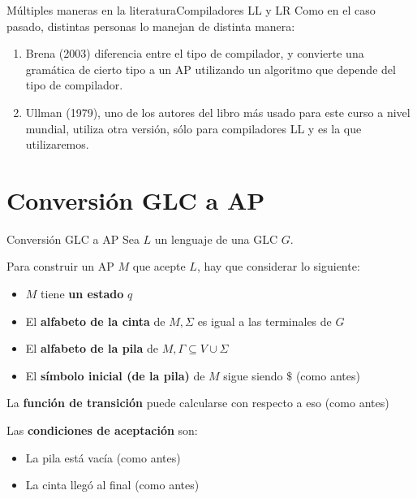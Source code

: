 \documentclass[spanish]{beamer}
\begin{document}
\begin{frame}{Múltiples maneras en la literatura}{Compiladores LL y LR}
    Como en el caso pasado, distintas personas lo manejan de distinta manera:

    \begin{enumerate}
        \itemsep2.5ex
        \item Brena (2003) diferencia entre el tipo de compilador, y convierte una gramática de cierto tipo a un AP utilizando un algoritmo que depende del tipo de compilador. \pause
        \item Ullman (1979), uno de los autores del libro más usado para este curso a nivel mundial, utiliza otra versión, sólo para compiladores LL y es la que utilizaremos.
    \end{enumerate}
\end{frame}

\section{Conversión GLC a AP}

\begin{frame}{Conversión GLC a AP}
    Sea $L$ un lenguaje de una GLC $G$. \pause

    \bigskip

    Para construir un AP $M$ que acepte $L$, hay que considerar lo siguiente: \pause

    \begin{itemize}
        \item $M$ tiene \textbf{un estado} $q$ \pause
        \item El \textbf{alfabeto de la cinta} de $M, \Sigma$ es igual a las terminales de $G$ \pause
        \item El \textbf{alfabeto de la pila}  de $M, \Gamma \subseteq V \cup \Sigma$ \pause
        \item El \textbf{símbolo inicial (de la pila)} de $M$ sigue siendo $\$$ (como antes) \pause
    \end{itemize}

    La \textbf{función de transición} puede calcularse con respecto a eso (como antes) \pause

    \bigskip

    Las \textbf{condiciones de aceptación} son:

    \begin{itemize}
        \item La pila está vacía (como antes) \pause
        \item La cinta llegó al final (como antes)
    \end{itemize}
    
\end{frame}
\end{document}
